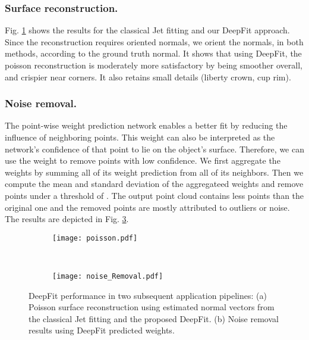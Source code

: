 \subsubsection{Surface reconstruction.}
Fig. \ref{fig:results:poisson_recon} shows the results for the classical Jet fitting and our DeepFit approach. Since the reconstruction requires oriented normals, we orient the normals, in both methods, according to the ground truth normal. It shows that using DeepFit, the poisson reconstruction is moderately more satisfactory by being smoother overall, and crispier near corners. It also retains small details (liberty crown, cup rim).  



\subsubsection{Noise removal.}
The point-wise weight prediction network enables a better fit by reducing the influence of neighboring points. This weight can also be interpreted as the network's confidence of that point to lie on the object's surface. Therefore, we can use the weight to remove points with low confidence.   We first aggregate the weights by summing all of its weight prediction from all of its neighbors. Then we compute the mean and standard deviation of the aggregateed weights and remove points under a threshold of .  The output point cloud contains less points than the original one and the removed points are mostly attributed to outliers or noise. The results are depicted in Fig. \ref{fig:results:noise_removal}.

\begin{figure}[t]
\centering
    \begin{subfigure}{.48\textwidth}
        \centering
    	\texttt{[image: poisson.pdf]}
    	\caption{}
    	\label{fig:results:poisson_recon} 
\end{subfigure}
    \unskip\ \vrule\ 
\begin{subfigure}{.48\textwidth}
    \centering
    \texttt{[image: noise\_Removal.pdf]}
    \caption{}
    \label{fig:results:noise_removal}
    \end{subfigure}
    \caption{DeepFit performance in two subsequent application pipelines: (a) Poisson surface reconstruction using estimated normal vectors from the classical Jet fitting and the proposed DeepFit. (b) Noise removal results using DeepFit predicted weights.}
\end{figure}